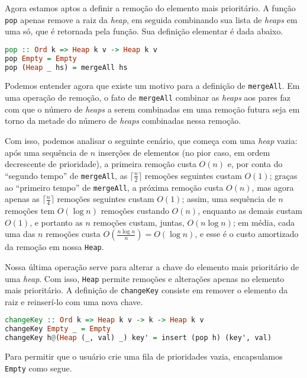 \documentclass[a4paper]{article}
\begin{document}
Agora estamos aptos a definir a remoção do elemento mais prioritário.
A função \texttt{pop} apenas remove a raiz da \emph{heap}, em seguida combinando sua lista de \emph{heaps} em uma só, que é retornada pela função.
Sua  definição elementar é dada abaixo.

\begin{lstlisting}[language=haskell, frame=single]
pop :: Ord k => Heap k v -> Heap k v
pop Empty = Empty
pop (Heap _ hs) = mergeAll hs
\end{lstlisting}

Podemos entender agora que existe um motivo para a definição de \texttt{mergeAll}.
Em uma operação de remoção, o fato de \texttt{mergeAll} combinar as \emph{heaps} aos pares faz com que o número de \emph{heaps} a serem combinadas em uma remoção futura seja em torno da metade do número de \emph{heaps} combinadas nessa remoção.

Com isso, podemos analisar o seguinte cenário, que começa com uma \emph{heap} vazia:
após uma sequência de $n$ inserções de elementos (no pior caso, em ordem decrescente de prioridade), a primeira remoção custa $O(n)$ e, por conta do ``segundo tempo'' de \texttt{mergeAll}, as $\lceil\frac{n}{2}\rceil$ remoções seguintes custam $O(1)$;
graças ao ``primeiro tempo'' de \texttt{mergeAll}, a próxima remoção custa $O(n)$, mas agora apenas as $\lceil\frac{n}{4}\rceil$ remoções seguintes custam $O(1)$;
assim, uma sequência de $n$ remoções tem $O(\log n)$ remoções custando $O(n)$, enquanto as demais custam $O(1)$, e portanto as $n$ remoções custam, juntas, $O(n \log n)$;
em média, cada uma das $n$ remoções custa $O(\frac{n \log n}{n}) = O(\log n)$, e esse é o custo amortizado da remoção em nossa \texttt{Heap}.

Nossa última operação serve para alterar a chave do elemento mais prioritário de uma \emph{heap}.
Com isso, \texttt{Heap} permite remoções e alterações apenas no elemento mais prioritário.
A definição de \texttt{changeKey} consiste em remover o elemento da raiz e reinserí-lo com uma nova chave.

\begin{lstlisting}[language=haskell, frame=single]
changeKey :: Ord k => Heap k v -> k -> Heap k v
changeKey Empty _ = Empty
changeKey h@(Heap (_, val) _) key' = insert (pop h) (key', val)
\end{lstlisting}

Para permitir que o usuário crie uma fila de prioridades vazia, encapsulamos \texttt{Empty} como segue.
\end{document}
